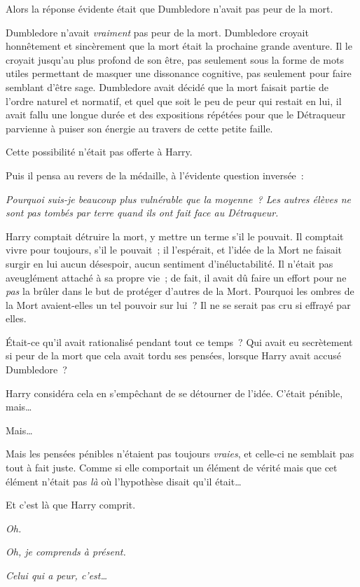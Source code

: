 Alors la réponse évidente était que Dumbledore n'avait pas peur de la mort.

Dumbledore n'avait \emph{vraiment} pas peur de la mort.
Dumbledore croyait honnêtement et sincèrement que la mort était la prochaine grande aventure.
Il le croyait jusqu'au plus profond de son être, pas seulement sous la forme de mots utiles permettant de masquer une dissonance cognitive, pas seulement pour faire semblant d'être sage.
Dumbledore avait décidé que la mort faisait partie de l'ordre naturel et normatif, et quel que soit le peu de peur qui restait en lui, il avait fallu une longue durée et des expositions répétées pour que le Détraqueur parvienne à puiser son énergie au travers de cette petite faille.

Cette possibilité n'était pas offerte à Harry.

Puis il pensa au revers de la médaille, à l'évidente question inversée~:

\emph{Pourquoi suis-je beaucoup plus vulnérable que la moyenne~?
Les autres élèves ne sont pas tombés par terre quand ils ont fait face au Détraqueur.}

Harry comptait détruire la mort, y mettre un terme s'il le pouvait.
Il comptait vivre pour toujours, s'il le pouvait~; il l'espérait, et l'idée de la Mort ne faisait surgir en lui aucun désespoir, aucun sentiment d'inéluctabilité.
Il n'était pas aveuglément attaché à sa propre vie~; de fait, il avait dû faire un effort pour ne \emph{pas} la brûler dans le but de protéger d'autres de la Mort.
Pourquoi les ombres de la Mort avaient-elles un tel pouvoir sur lui~?
Il ne se serait pas cru si effrayé par elles.

Était-ce qu'il avait rationalisé pendant tout ce temps~?
Qui avait eu secrètement si peur de la mort que cela avait tordu ses pensées, lorsque Harry avait accusé Dumbledore~?

Harry considéra cela en s'empêchant de se détourner de l'idée.
C'était pénible, mais…

Mais…

Mais les pensées pénibles n'étaient pas toujours \emph{vraies}, et celle-ci ne semblait pas tout à fait juste.
Comme si elle comportait un élément de vérité mais que cet élément n'était pas \emph{là} où l'hypothèse disait qu'il était…

Et c'est là que Harry comprit.

\emph{Oh.}

\emph{Oh, je comprends à présent.}

\emph{Celui qui a peur, c'est…}

